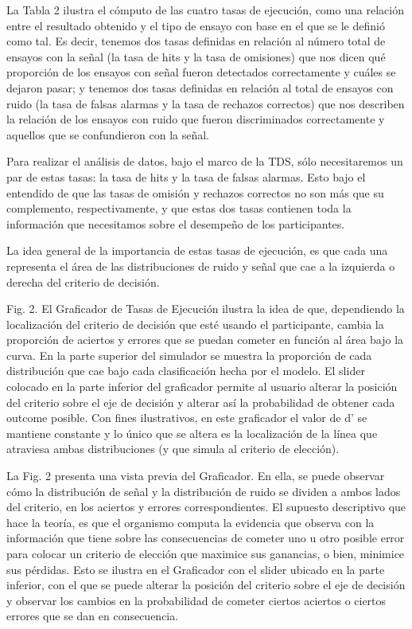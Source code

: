 La Tabla 2 ilustra el cómputo de las cuatro tasas de ejecución, como una relación entre el resultado obtenido y el tipo de ensayo con base en el que se le definió como tal. Es decir, tenemos dos tasas definidas en relación al número total de ensayos con la señal (la tasa de hits y la tasa de omisiones) que nos dicen qué proporción de los ensayos con señal fueron detectados correctamente y cuáles se dejaron pasar; y tenemos dos tasas definidas en relación al total de ensayos con ruido (la tasa de falsas alarmas y la tasa de rechazos correctos) que nos describen la relación de los ensayos con ruido que fueron discriminados correctamente y aquellos que se confundieron con la señal.

Para realizar el análisis de datos, bajo el marco de la TDS, sólo necesitaremos un par de estas tasas: la tasa de hits y la tasa de falsas alarmas. Esto bajo el entendido de que las tasas de omisión y rechazos correctos no son más que su complemento, respectivamente, y que estas dos tasas contienen toda la información que necesitamos sobre el desempeño de los participantes.

La idea general de la importancia de estas tasas de ejecución, es que cada una representa el área de las distribuciones de ruido y señal que cae a la izquierda o derecha del criterio de decisión.

Fig. 2. El Graficador de Tasas de Ejecución ilustra la idea de que, dependiendo la localización del criterio de decisión que esté usando el participante, cambia la proporción de aciertos y errores que se puedan cometer en función al área bajo la curva. En la parte superior del simulador se muestra la proporción de cada distribución que cae bajo cada clasificación hecha por el modelo. El slider colocado en la parte inferior del graficador permite al usuario alterar la posición del criterio sobre el eje de decisión y alterar así la probabilidad de obtener cada outcome posible.  Con fines ilustrativos, en este graficador el valor de d’ se mantiene constante y lo único que se altera es la localización de la línea que atraviesa ambas distribuciones (y que simula al criterio de elección).

La Fig. 2 presenta una vista previa del Graficador. En ella, se puede observar cómo la distribución de señal y la distribución de ruido se dividen a ambos lados del criterio, en los aciertos y errores correspondientes. El supuesto descriptivo que hace la teoría, es que el organismo computa la evidencia que observa con la información que tiene sobre las consecuencias de cometer uno u otro posible error para colocar un criterio de elección que maximice sus ganancias, o bien, minimice sus pérdidas.  Esto se ilustra en el Graficador con el slider ubicado en la parte inferior, con el que se puede alterar la posición del criterio sobre el eje de decisión y observar los cambios en la probabilidad de cometer ciertos aciertos o ciertos errores que se dan en consecuencia.

